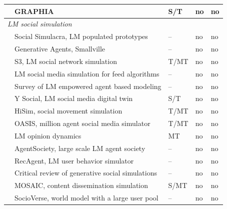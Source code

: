 \begin{table}[t]
{\begin{tabular}{lllll}
\citet{ji2026graphia}
    & GRAPHIA & S/T & no & no \\


\midrule
\multicolumn{5}{l}{\textit{LM social simulation}} \\

\citet{park2022simulacra}
    & Social Simulacra, LM populated prototypes & -- & no & no \\

\citet{park2023generative}
    & Generative Agents, Smallville & -- & no & no \\

\citet{gao2023s3}
    & S3, LM social network simulation & T/MT & no & no \\

\citet{tornberg2023simulating}
    & LM social media simulation for feed algorithms & -- & no & no \\

\citet{gao2024survey}
    & Survey of LM empowered agent based modeling & -- & no & no \\

\citet{rossetti2024ysocial}
    & Y Social, LM social media digital twin & S/T & no & no \\

\citet{mou2024hisim}
    & HiSim, social movement simulation & T/MT & no & no \\

\citet{yang2024oasis}
    & OASIS, million agent social media simulator & T/MT & no & no \\

\citet{chuang2024opinion}
    & LM opinion dynamics & MT & no & no \\

\citet{piao2025agentsociety}
    & AgentSociety, large scale LM agent society & -- & no & no \\

\citet{wang2025recagent}
    & RecAgent, LM user behavior simulator & -- & no & no \\

\citet{larooij2025critical}
    & Critical review of generative social simulations & -- & no & no \\

\citet{saeedi2025mosaic}
    & MOSAIC, content dissemination simulation & S/MT & no & no \\

\citet{zhang2025socioverse}
    & SocioVerse, world model with a large user pool & -- & no & no \\


\end{tabular}}
\end{table}
